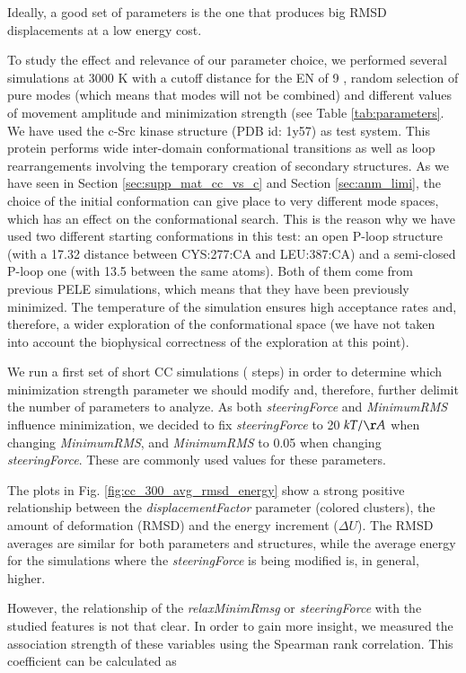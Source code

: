 Ideally, a good set of parameters is the one that produces big RMSD displacements at a low energy cost.

To study the effect and relevance of our parameter choice, we performed several simulations at 3000 K with a cutoff distance for the EN of 9 \angstrom, random selection of pure modes (which means that modes will not be combined) and different values of movement amplitude and minimization strength (see Table \ref{tab:parameters}. We have used the c-Src kinase structure (PDB id: 1y57) as test system. This protein performs wide inter-domain conformational transitions as well as loop rearrangements involving the temporary creation of secondary structures. As we have seen in Section \ref{sec:supp_mat_cc_vs_c} and Section \ref{sec:anm_limi}, the choice of the initial conformation can give place to very different mode spaces, which has an effect on the conformational search. This is the reason why  we have used two different starting conformations in this test: an open P-loop structure (with a 17.32 \angstrom distance between CYS:277:CA and LEU:387:CA) and a semi-closed P-loop one (with 13.5 \angstrom between the same atoms). Both of them come from previous PELE simulations, which means that they have been previously minimized. The temperature of the simulation ensures high acceptance rates and, therefore, a wider exploration of the conformational space (we have not taken into account the biophysical correctness of the exploration at this point).
 
We run a first set of short CC simulations ( steps) in order to determine which minimization strength parameter we should modify and, therefore, further delimit the number of parameters to analyze. As both \textit{steeringForce} and \textit{MinimumRMS} influence minimization, we decided to fix \textit{steeringForce} to 20 $kT/\AA$ when changing \textit{MinimumRMS}, and \textit{MinimumRMS} to 0.05  when changing \textit{steeringForce}. These are commonly used values for these parameters.

The plots in Fig. \ref{fig:cc_300_avg_rmsd_energy} show a strong positive relationship between the \textit{displacementFactor} parameter (colored clusters), the amount of deformation (RMSD) and the energy increment ($\Delta U$). The RMSD averages are similar for both parameters and structures, while the average energy for the simulations where the \textit{steeringForce} is being modified is, in general, higher.  

However, the relationship of the \textit{relaxMinimRmsg} or \textit{steeringForce} with the studied features is not that clear. In order to gain more insight, we measured the association strength of these variables using the Spearman rank correlation. This coefficient can be calculated as 

